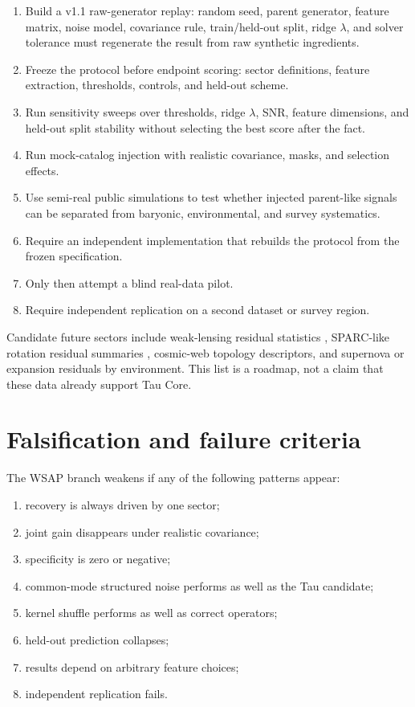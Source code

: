 \documentclass[12pt]{article}
\begin{document}
\begin{enumerate}[leftmargin=1.4em]
\item Build a v1.1 raw-generator replay: random seed, parent generator, feature
matrix, noise model, covariance rule, train/held-out split, ridge
\(\lambda\), and solver tolerance must regenerate the result from raw
synthetic ingredients.
\item Freeze the protocol before endpoint scoring: sector definitions, feature
extraction, thresholds, controls, and held-out scheme.
\item Run sensitivity sweeps over thresholds, ridge \(\lambda\), SNR,
feature dimensions, and held-out split stability without selecting the best
score after the fact.
\item Run mock-catalog injection with realistic covariance, masks, and
selection effects.
\item Use semi-real public simulations to test whether injected parent-like
signals can be separated from baryonic, environmental, and survey systematics.
\item Require an independent implementation that rebuilds the protocol from the
frozen specification.
\item Only then attempt a blind real-data pilot.
\item Require independent replication on a second dataset or survey region.
\end{enumerate}

Candidate future sectors include weak-lensing residual statistics
\cite{KiDS1000}, SPARC-like rotation residual summaries \cite{SPARC},
cosmic-web topology descriptors, and supernova or expansion residuals by
environment.  This list is a roadmap, not a claim that these data already
support Tau Core.

\section{Falsification and failure criteria}

The WSAP branch weakens if any of the following patterns appear:

\begin{enumerate}[leftmargin=1.4em]
\item recovery is always driven by one sector;
\item joint gain disappears under realistic covariance;
\item specificity is zero or negative;
\item common-mode structured noise performs as well as the Tau candidate;
\item kernel shuffle performs as well as correct operators;
\item held-out prediction collapses;
\item results depend on arbitrary feature choices;
\item independent replication fails.
\end{enumerate}
\end{document}
